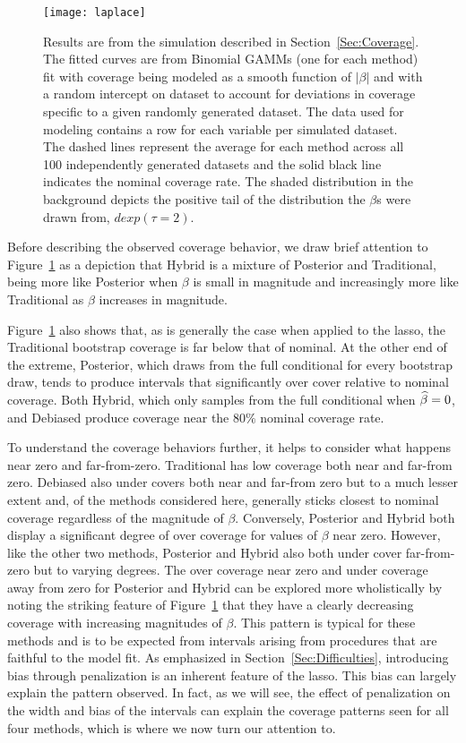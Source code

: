\begin{figure}
  \texttt{[image: laplace]}
  \caption{\label{Fig:laplace} Results are from the simulation described in Section~\ref{Sec:Coverage}. The fitted curves are from Binomial GAMMs (one for each method) fit with coverage being modeled as a smooth function of $|\beta|$ and with a random intercept on dataset to account for deviations in coverage specific to a given randomly generated dataset. The data used for modeling contains a row for each variable per simulated dataset. The dashed lines represent the average for each method across all 100 independently generated datasets and the solid black line indicates the nominal coverage rate. The shaded distribution in the background depicts the positive tail of the distribution the $\beta$s were drawn from, $dexp(\tau = 2)$.}
\end{figure}

Before describing the observed coverage behavior, we draw brief attention to Figure~\ref{Fig:laplace} as a depiction that Hybrid is a mixture of Posterior and Traditional, being more like Posterior when $\beta$ is small in magnitude and increasingly more like Traditional as $\beta$ increases in magnitude.

Figure~\ref{Fig:laplace} also shows that, as is generally the case when applied to the lasso, the Traditional bootstrap coverage is far below that of nominal. At the other end of the extreme, Posterior, which draws from the full conditional for every bootstrap draw, tends to produce intervals that significantly over cover relative to nominal coverage. Both Hybrid, which only samples from the full conditional when $\widehat{\beta} = 0$, and Debiased produce coverage near the $80\%$ nominal coverage rate.

To understand the coverage behaviors further, it helps to consider what happens near zero and far-from-zero. Traditional has low coverage both near and far-from zero. Debiased also under covers both near and far-from zero but to a much lesser extent and, of the methods considered here, generally sticks closest to nominal coverage regardless of the magnitude of $\beta$. Conversely, Posterior and Hybrid both display a significant degree of over coverage for values of $\beta$ near zero. However, like the other two methods, Posterior and Hybrid also both under cover far-from-zero but to varying degrees. The over coverage near zero and under coverage away from zero for Posterior and Hybrid can be explored more wholistically by noting the striking feature of Figure~\ref{Fig:laplace} that they have a clearly decreasing coverage with increasing magnitudes of $\beta$. This pattern is typical for these methods and is to be expected from intervals arising from procedures that are faithful to the model fit. As emphasized in Section~\ref{Sec:Difficulties}, introducing bias through penalization is an inherent feature of the lasso. This bias can largely explain the pattern observed. In fact, as we will see, the effect of penalization on the width and bias of the intervals can explain the coverage patterns seen for all four methods, which is where we now turn our attention to.

